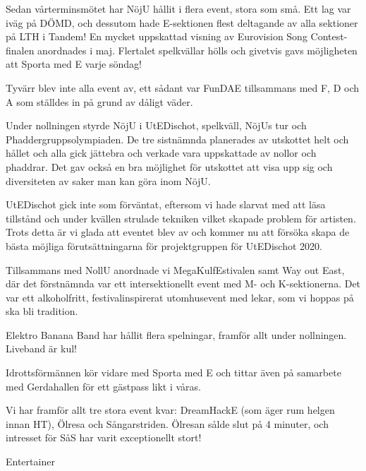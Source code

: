 \documentclass[../_main/handlingar.tex]{subfiles}
\begin{document}
\vspace{8px}

Sedan vårterminsmötet har NöjU hållit i flera event, stora som små. Ett lag var iväg på DÖMD, och dessutom hade E-sektionen flest deltagande av alla sektioner på LTH i Tandem! En mycket uppskattad visning av Eurovision Song Contest-finalen anordnades i maj. Flertalet spelkvällar hölls och givetvis gavs möjligheten att Sporta med E varje söndag! 

Tyvärr blev inte alla event av, ett sådant var FunDAE tillsammans med F, D och A som ställdes in på grund av dåligt väder. 

Under nollningen styrde NöjU i UtEDischot, spelkväll, NöjUs tur och Phaddergruppsolympiaden. De tre sistnämnda planerades av utskottet helt och hållet och alla gick jättebra och verkade vara uppskattade av nollor och phaddrar. Det gav också en bra möjlighet för utskottet att visa upp sig och diversiteten av saker man kan göra inom NöjU. 

UtEDischot gick inte som förväntat, eftersom vi hade slarvat med att läsa tillstånd och under kvällen strulade tekniken vilket skapade problem för artisten. Trots detta är vi glada att eventet blev av och kommer nu att försöka skapa de bästa möjliga förutsättningarna för  projektgruppen för UtEDischot 2020. 

Tillsammans med NollU anordnade vi MegaKulfEstivalen samt Way out East, där det förstnämnda var ett intersektionellt event med M- och K-sektionerna. Det var ett alkoholfritt, festivalinspirerat utomhusevent med lekar, som vi hoppas på ska bli tradition. 

Elektro Banana Band har hållit flera spelningar, framför allt under nollningen. Liveband är kul!

Idrottsförmännen kör vidare med Sporta med E och tittar även på samarbete med Gerdahallen för ett gästpass likt i våras.

Vi har framför allt tre stora event kvar: DreamHackE (som äger rum helgen innan HT), Ölresa och Sångarstriden. Ölresan sålde slut på 4 minuter, och intresset för SåS har varit exceptionellt stort!
\begin{signatures}{1}
    \mvh
    \signature{Saga Åslund}{Entertainer}
\end{signatures}
\end{document}
